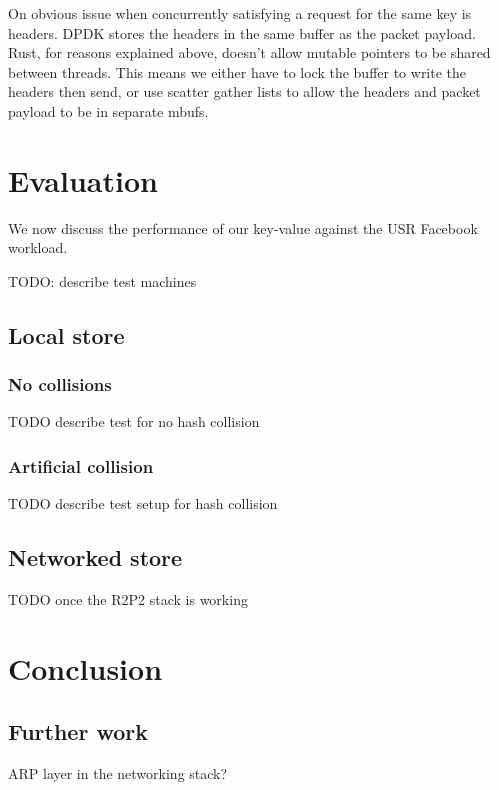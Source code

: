 \documentclass[11pt]{article}
\begin{document}
On obvious issue when concurrently satisfying a request for the same
key is headers. DPDK stores the headers in the same buffer as the
packet payload. Rust, for reasons explained above, doesn't allow
mutable pointers to be shared between threads. This means we either
have to lock the buffer to write the headers then send, or use scatter
gather lists to allow the headers and packet payload to be in separate
mbufs.

\section{Evaluation}

We now discuss the performance of our key-value against the USR
Facebook workload.

TODO: describe test machines

\subsection{Local store}

\subsubsection{No collisions}

TODO describe test for no hash collision

\subsubsection{Artificial collision}

TODO describe test setup for hash collision

\subsection{Networked store}

TODO once the R2P2 stack is working

\section{Conclusion}



\subsection{Further work}
ARP layer in the networking stack?
\end{document}

